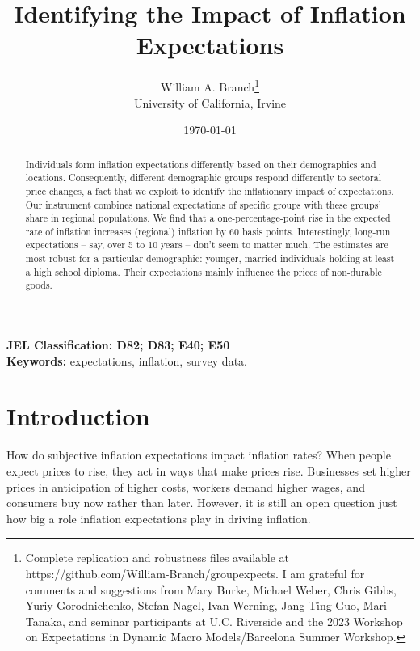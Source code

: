 \documentclass[12pt]{article}
\begin{document}
\title{\vspace{-1 in} Identifying the Impact of Inflation Expectations}
\author{William A. Branch\thanks{Complete replication and robustness files available at https://github.com/William-Branch/groupexpects. I am grateful for comments and suggestions from Mary Burke, Michael Weber, Chris Gibbs, Yuriy Gorodnichenko, Stefan Nagel, Ivan Werning, Jang-Ting Guo, Mari Tanaka, and seminar participants at U.C. Riverside and the 2023 Workshop on Expectations in Dynamic Macro Models/Barcelona Summer Workshop. } \\
University of California, Irvine }
\date{\today}
\maketitle
\vspace{-0.45in}

\begin{abstract}

Individuals form inflation expectations differently based on their demographics and locations.  Consequently, different demographic groups respond differently to sectoral price changes, a fact that we exploit to identify the inflationary impact of expectations.  Our instrument combines national expectations of specific groups with these groups' share in regional populations.  We find that a one-percentage-point rise in the expected rate of inflation increases (regional) inflation by 60 basis points.  Interestingly, long-run expectations -- say, over 5 to 10 years -- don't seem to matter much.  The estimates are most robust for a particular demographic: younger, married individuals holding at least a high school diploma.  Their expectations mainly influence the prices of non-durable goods.
\end{abstract}

\textbf{JEL Classification: D82; D83; E40; E50}\\

\textbf{Keywords:} expectations, inflation, survey data.

\section{Introduction}

How do subjective inflation expectations impact inflation rates? When people expect prices to rise, they act in ways that make prices rise. Businesses set higher prices in anticipation of higher costs, workers demand higher wages, and consumers buy now rather than later.  However, it is still an open question just how big a role inflation expectations play in driving inflation.
\end{document}
